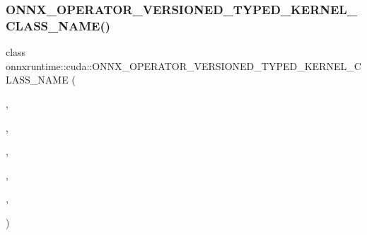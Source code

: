 \subsubsection{\texorpdfstring{O\+N\+N\+X\+\_\+\+O\+P\+E\+R\+A\+T\+O\+R\+\_\+\+V\+E\+R\+S\+I\+O\+N\+E\+D\+\_\+\+T\+Y\+P\+E\+D\+\_\+\+K\+E\+R\+N\+E\+L\+\_\+\+C\+L\+A\+S\+S\+\_\+\+N\+A\+M\+E()}{ONNX\_OPERATOR\_VERSIONED\_TYPED\_KERNEL\_CLASS\_NAME()}\hspace{0.1cm}{\footnotesize\ttfamily [10/10]}}
{\footnotesize\ttfamily class onnxruntime\+::cuda\+::\+O\+N\+N\+X\+\_\+\+O\+P\+E\+R\+A\+T\+O\+R\+\_\+\+V\+E\+R\+S\+I\+O\+N\+E\+D\+\_\+\+T\+Y\+P\+E\+D\+\_\+\+K\+E\+R\+N\+E\+L\+\_\+\+C\+L\+A\+S\+S\+\_\+\+N\+A\+ME (\begin{DoxyParamCaption}\item[{\mbox{\hyperlink{namespaceonnxruntime_a73ebc64887ddd1968e3cef47ffefe35b}{k\+Cuda\+Execution\+Provider}}}]{,  }\item[{\mbox{\hyperlink{namespaceonnxruntime_ac0e7c0c106a2c9e9594560a3ab289fa0}{k\+Onnx\+Domain}}}]{,  }\item[{6}]{,  }\item[{7}]{,  }\item[{uint64\+\_\+t}]{,  }\item[{\mbox{\hyperlink{classonnxruntime_1_1cuda_1_1Sum}{Sum}}}]{ }\end{DoxyParamCaption})}

\mbox{\label{namespaceonnxruntime_1_1cuda_a89919b025b81f1491d68cc99fb35ff6d}} 
